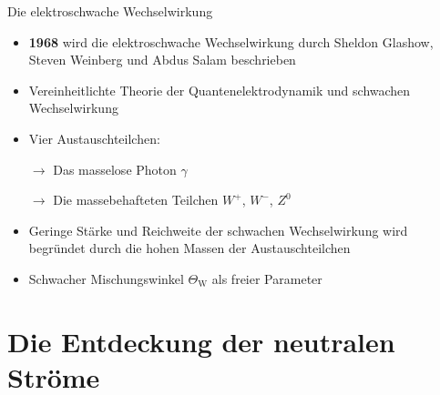 \documentclass[aspectratio=1610, professionalfonts, 10pt]{beamer}
\begin{document}
\begin{frame}{Die elektroschwache Wechselwirkung}
			\begin{itemize}
				\setlength\itemsep{0.5em}
				\item \textbf{1968} wird die elektroschwache Wechselwirkung durch Sheldon Glashow, Steven Weinberg und Abdus Salam beschrieben
				\item Vereinheitlichte Theorie der Quantenelektrodynamik und schwachen Wechselwirkung
				\item Vier Austauschteilchen:
				\item [$\rightarrow$] Das masselose Photon $\gamma$
				\item [$\rightarrow$] Die massebehafteten Teilchen $W^+$, $W^-$, $Z^0$
				\item Geringe Stärke und Reichweite der schwachen Wechselwirkung wird begründet durch die hohen Massen der Austauschteilchen
				\item Schwacher Mischungswinkel $\Theta_\text{W}$ als freier Parameter
			\end{itemize}

\end{frame}


\section{Die Entdeckung der neutralen Ströme}
\end{document}
